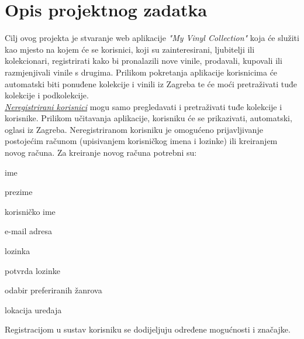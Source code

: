 \chapter{Opis projektnog zadatka}
		
%		
%		
	
		\text Cilj ovog projekta je stvaranje web aplikacije \textit{"My Vinyl Collection"} koja će služiti kao mjesto na kojem će se korisnici, koji su zainteresirani, ljubitelji ili kolekcionari, registrirati kako bi pronalazili nove vinile, prodavali, kupovali ili razmjenjivali vinile s drugima.
		Prilikom pokretanja aplikacije korisnicima će automatski biti ponuđene kolekcije i vinili iz Zagreba te će moći pretraživati tuđe kolekcije i podkolekcije.\\
		
		\textit{\underline{Neregistrirani korisnici}} mogu samo pregledavati i pretraživati tuđe kolekcije i korisnike. Prilikom učitavanja aplikacije, korisniku će se prikazivati, automatski, oglasi iz Zagreba. Neregistriranom korisniku je omogućeno prijavljivanje postojećim računom (upisivanjem korisničkog imena i lozinke) ili kreiranjem novog računa. Za kreiranje novog računa potrebni su: 
		\begin{packed_item}
			\item ime
			\item prezime
			\item korisničko ime
			\item e-mail adresa
			\item lozinka
			\item potvrda lozinke
			\item odabir preferiranih žanrova
			\item lokacija uređaja
		\end{packed_item}
Registracijom u sustav korisniku se dodijeljuju određene mogućnosti i značajke.\\

